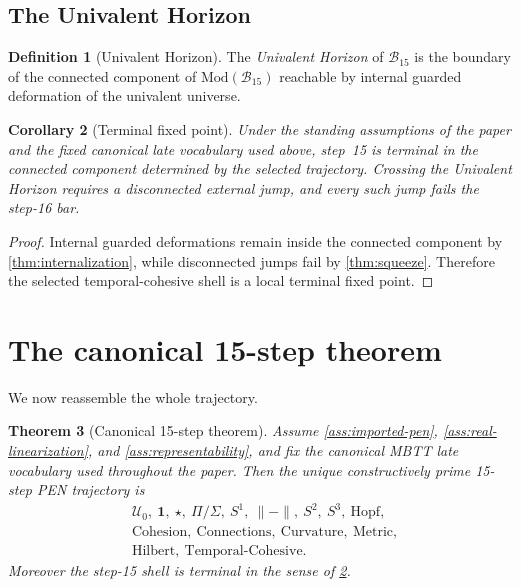\documentclass[11pt]{article}
\theoremstyle{plain}
\newtheorem{theorem}{Theorem}[section]
\newtheorem{corollary}[theorem]{Corollary}
\theoremstyle{definition}
\newtheorem{definition}[theorem]{Definition}
\theoremstyle{remark}
\newcommand{\U}{\mathcal{U}}
\newcommand{\B}{\mathcal{B}}
\newcommand{\ModCat}{\mathrm{Mod}}
\begin{document}
\subsection{The Univalent Horizon}

\begin{definition}[Univalent Horizon]
\label{def:horizon}
The \emph{Univalent Horizon} of $\B_{15}$ is the boundary of the connected component of $\ModCat(\B_{15})$ reachable by internal guarded deformation of the univalent universe.
\end{definition}

\begin{corollary}[Terminal fixed point]
\label{cor:terminal}
Under the standing assumptions of the paper and the fixed canonical late vocabulary used above, step~15 is terminal in the connected component determined by the selected trajectory. Crossing the Univalent Horizon requires a disconnected external jump, and every such jump fails the step-16 bar.
\end{corollary}

\begin{proof}
Internal guarded deformations remain inside the connected component by \cref{thm:internalization}, while disconnected jumps fail by \cref{thm:squeeze}. Therefore the selected temporal-cohesive shell is a local terminal fixed point.
\end{proof}

\section{The canonical 15-step theorem}

We now reassemble the whole trajectory.

\begin{theorem}[Canonical 15-step theorem]
\label{thm:full-invariance}
Assume \cref{ass:imported-pen}, \cref{ass:real-linearization}, and \cref{ass:representability}, and fix the canonical MBTT late vocabulary used throughout the paper. Then the unique constructively prime 15-step PEN trajectory is
\[
  \begin{aligned}
    &\U_0,\ \mathbf 1,\ \star,\ \Pi/\Sigma,\ S^1,\ \|{-}\|,\ S^2,\ S^3,\ \mathrm{Hopf},\\
    &\mathrm{Cohesion},\ \mathrm{Connections},\ \mathrm{Curvature},\ \mathrm{Metric},\\
    &\mathrm{Hilbert},\ \mathrm{Temporal\mbox{-}Cohesive}.
  \end{aligned}
\]
Moreover the step-15 shell is terminal in the sense of \cref{cor:terminal}.
\end{theorem}
\end{document}
